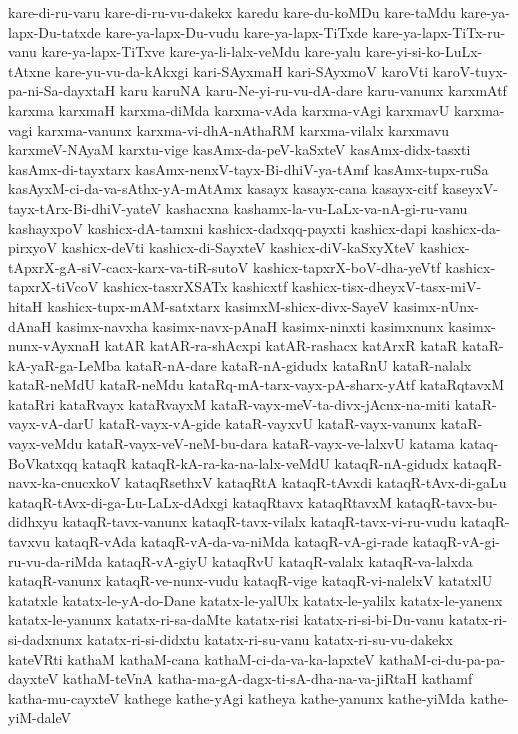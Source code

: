 {kare-di-ru-varu
kare-di-ru-vu-dakekx
karedu
kare-du-koMDu
kare-taMdu
kare-ya-lapx-Du-tatxde
kare-ya-lapx-Du-vudu
kare-ya-lapx-TiTxde
kare-ya-lapx-TiTx-ru-vanu
kare-ya-lapx-TiTxve
kare-ya-li-lalx-veMdu
kare-yalu
kare-yi-si-ko-LuLx-tAtxne
kare-yu-vu-da-kAkxgi
kari-SAyxmaH
kari-SAyxmoV
karoVti
karoV-tuyx-pa-ni-Sa-dayxtaH
karu
karuNA
karu-Ne-yi-ru-vu-dA-dare
karu-vanunx
karxmAtf
karxma
karxmaH
karxma-diMda
karxma-vAda
karxma-vAgi
karxmavU
karxma-vagi
karxma-vanunx
karxma-vi-dhA-nAthaRM
karxma-vilalx
karxmavu
karxmeV-NAyaM
karxtu-vige
kasAmx-da-peV-kaSxteV
kasAmx-didx-tasxti
kasAmx-di-tayxtarx
kasAmx-nenxV-tayx-Bi-dhiV-ya-tAmf
kasAmx-tupx-ruSa
kasAyxM-ci-da-va-sAthx-yA-mAtAmx
kasayx
kasayx-cana
kasayx-citf
kaseyxV-tayx-tArx-Bi-dhiV-yateV
kashacxna
kashamx-la-vu-LaLx-va-nA-gi-ru-vanu
kashayxpoV
kashicx-dA-tamxni
kashicx-dadxqq-payxti
kashicx-dapi
kashicx-da-pirxyoV
kashicx-deVti
kashicx-di-SayxteV
kashicx-diV-kaSxyXteV
kashicx-tApxrX-gA-siV-cacx-karx-va-tiR-sutoV
kashicx-tapxrX-boV-dha-yeVtf
kashicx-tapxrX-tiVcoV
kashicx-tasxrXSATx
kashicxtf
kashicx-tisx-dheyxV-tasx-miV-hitaH
kashicx-tupx-mAM-satxtarx
kasimxM-shicx-divx-SayeV
kasimx-nUnx-dAnaH
kasimx-navxha
kasimx-navx-pAnaH
kasimx-ninxti
kasimxnunx
kasimx-nunx-vAyxnaH
katAR
katAR-ra-shAcxpi
katAR-rashacx
katArxR
kataR
kataR-kA-yaR-ga-LeMba
kataR-nA-dare
kataR-nA-gidudx
kataRnU
kataR-nalalx
kataR-neMdU
kataR-neMdu
kataRq-mA-tarx-vayx-pA-sharx-yAtf
kataRqtavxM
kataRri
kataRvayx
kataRvayxM
kataR-vayx-meV-ta-divx-jAcnx-na-miti
kataR-vayx-vA-darU
kataR-vayx-vA-gide
kataR-vayxvU
kataR-vayx-vanunx
kataR-vayx-veMdu
kataR-vayx-veV-neM-bu-dara
kataR-vayx-ve-lalxvU
katama
kataq-BoVkatxqq
kataqR
kataqR-kA-ra-ka-na-lalx-veMdU
kataqR-nA-gidudx
kataqR-navx-ka-cnucxkoV
kataqRsethxV
kataqRtA
kataqR-tAvxdi
kataqR-tAvx-di-gaLu
kataqR-tAvx-di-ga-Lu-LaLx-dAdxgi
kataqRtavx
kataqRtavxM
kataqR-tavx-bu-didhxyu
kataqR-tavx-vanunx
kataqR-tavx-vilalx
kataqR-tavx-vi-ru-vudu
kataqR-tavxvu
kataqR-vAda
kataqR-vA-da-va-niMda
kataqR-vA-gi-rade
kataqR-vA-gi-ru-vu-da-riMda
kataqR-vA-giyU
kataqRvU
kataqR-valalx
kataqR-va-lalxda
kataqR-vanunx
kataqR-ve-nunx-vudu
kataqR-vige
kataqR-vi-nalelxV
katatxlU
katatxle
katatx-le-yA-do-Dane
katatx-le-yalUlx
katatx-le-yalilx
katatx-le-yanenx
katatx-le-yanunx
katatx-ri-sa-daMte
katatx-risi
katatx-ri-si-bi-Du-vanu
katatx-ri-si-dadxnunx
katatx-ri-si-didxtu
katatx-ri-su-vanu
katatx-ri-su-vu-dakekx
kateVRti
kathaM
kathaM-cana
kathaM-ci-da-va-ka-lapxteV
kathaM-ci-du-pa-pa-dayxteV
kathaM-teVnA
katha-ma-gA-dagx-ti-sA-dha-na-va-jiRtaH
kathamf
katha-mu-cayxteV
kathege
kathe-yAgi
katheya
kathe-yanunx
kathe-yiMda
kathe-yiM-daleV
}
